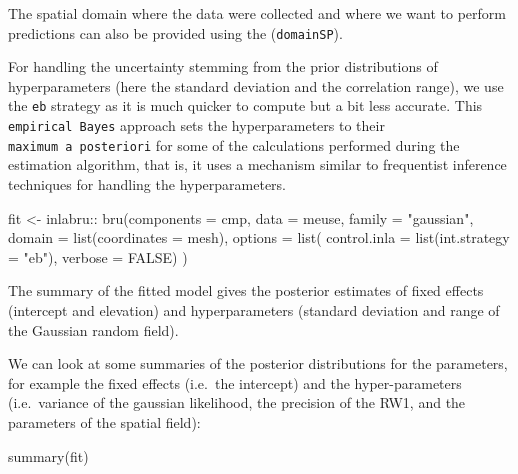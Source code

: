\documentclass[
  a4paper,
]{article}
\newenvironment{Shaded}{\begin{snugshade}}{\end{snugshade}}
\newcommand{\AttributeTok}[1]{\textcolor[rgb]{0.40,0.45,0.13}{#1}}
\newcommand{\ConstantTok}[1]{\textcolor[rgb]{0.56,0.35,0.01}{#1}}
\newcommand{\FunctionTok}[1]{\textcolor[rgb]{0.28,0.35,0.67}{#1}}
\newcommand{\NormalTok}[1]{\textcolor[rgb]{0.00,0.23,0.31}{#1}}
\newcommand{\OtherTok}[1]{\textcolor[rgb]{0.00,0.23,0.31}{#1}}
\newcommand{\SpecialCharTok}[1]{\textcolor[rgb]{0.37,0.37,0.37}{#1}}
\newcommand{\StringTok}[1]{\textcolor[rgb]{0.13,0.47,0.30}{#1}}
\begin{document}
The spatial domain where the data were collected and where we want to
perform predictions can also be provided using the (\texttt{domainSP}).

For handling the uncertainty stemming from the prior distributions of
hyperparameters (here the standard deviation and the correlation range),
we use the \texttt{eb} strategy as it is much quicker to compute but a
bit less accurate. This \texttt{empirical\ Bayes} approach sets the
hyperparameters to their \texttt{maximum\ a\ posteriori} for some of the
calculations performed during the estimation algorithm, that is, it uses
a mechanism similar to frequentist inference techniques for handling the
hyperparameters.

\begin{Shaded}
\begin{Highlighting}[]
\NormalTok{fit }\OtherTok{\textless{}{-}}\NormalTok{ inlabru}\SpecialCharTok{::} \FunctionTok{bru}\NormalTok{(}\AttributeTok{components =}\NormalTok{ cmp,}
           \AttributeTok{data =}\NormalTok{ meuse,}
           \AttributeTok{family =} \StringTok{"gaussian"}\NormalTok{,}
           \AttributeTok{domain =} \FunctionTok{list}\NormalTok{(}\AttributeTok{coordinates =}\NormalTok{ mesh),}
           \AttributeTok{options =} \FunctionTok{list}\NormalTok{(}
             \AttributeTok{control.inla =} \FunctionTok{list}\NormalTok{(}\AttributeTok{int.strategy =} \StringTok{"eb"}\NormalTok{),}
             \AttributeTok{verbose =} \ConstantTok{FALSE}\NormalTok{)}
\NormalTok{           )}
\end{Highlighting}
\end{Shaded}

The summary of the fitted model gives the posterior estimates of fixed
effects (intercept and elevation) and hyperparameters (standard
deviation and range of the Gaussian random field).

We can look at some summaries of the posterior distributions for the
parameters, for example the fixed effects (i.e.~the intercept) and the
hyper-parameters (i.e.~variance of the gaussian likelihood, the
precision of the RW1, and the parameters of the spatial field):

\begin{Shaded}
\begin{Highlighting}[]
\FunctionTok{summary}\NormalTok{(fit)}
\end{Highlighting}
\end{Shaded}
\end{document}
